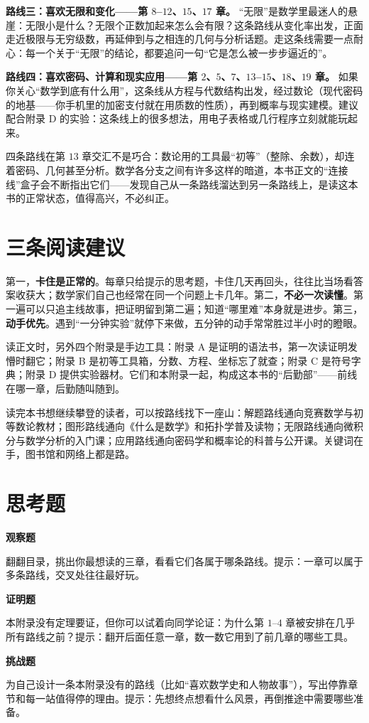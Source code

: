 \textbf{路线三：喜欢无限和变化——第 $8$–$12$、$15$、$17$ 章。} “无限”是数学里最迷人的悬崖：无限小是什么？无限个正数加起来怎么会有限？这条路线从变化率出发，正面走近极限与无穷级数，再延伸到与之相连的几何与分析话题。走这条线需要一点耐心：每一个关于“无限”的结论，都要追问一句“它是怎么被一步步逼近的”。

\textbf{路线四：喜欢密码、计算和现实应用——第 $2$、$5$、$7$、$13$–$15$、$18$、$19$ 章。} 如果你关心“数学到底有什么用”，这条线从方程与代数结构出发，经过数论（现代密码的地基——你手机里的加密支付就在用质数的性质），再到概率与现实建模。建议配合附录 D 的实验：这条线上的很多想法，用电子表格或几行程序立刻就能玩起来。

\begin{lianjie}
四条路线在第 $13$ 章交汇不是巧合：数论用的工具最“初等”（整除、余数），却连着密码、几何甚至分析。数学各分支之间有许多这样的暗道，本书正文的“连接线”盒子会不断指出它们——发现自己从一条路线溜达到另一条路线上，是读这本书的正常状态，值得高兴，不必纠正。
\end{lianjie}

\section{三条阅读建议}

第一，\textbf{卡住是正常的}。每章只给提示的思考题，卡住几天再回头，往往比当场看答案收获大；数学家们自己也经常在同一个问题上卡几年。第二，\textbf{不必一次读懂}。第一遍可以只追主线故事，把证明留到第二遍；知道“哪里难”本身就是进步。第三，\textbf{动手优先}。遇到“一分钟实验”就停下来做，五分钟的动手常常胜过半小时的瞪眼。

读正文时，另外四个附录是手边工具：附录 A 是证明的语法书，第一次读证明发懵时翻它；附录 B 是初等工具箱，分数、方程、坐标忘了就查；附录 C 是符号字典；附录 D 提供实验器材。它们和本附录一起，构成这本书的“后勤部”——前线在哪一章，后勤随叫随到。

\begin{pandeng}
读完本书想继续攀登的读者，可以按路线找下一座山：解题路线通向竞赛数学与初等数论教材；图形路线通向《什么是数学》和拓扑学普及读物；无限路线通向微积分与数学分析的入门课；应用路线通向密码学和概率论的科普与公开课。关键词在手，图书馆和网络上都是路。
\end{pandeng}

\section*{思考题}

\textbf{观察题}
\begin{sikao}
\item 翻翻目录，挑出你最想读的三章，看看它们各属于哪条路线。提示：一章可以属于多条路线，交叉处往往最好玩。
\end{sikao}

\textbf{证明题}
\begin{sikao}
\item 本附录没有定理要证，但你可以试着向同学论证：为什么第 $1$–$4$ 章被安排在几乎所有路线之前？提示：翻开后面任意一章，数一数它用到了前几章的哪些工具。
\end{sikao}

\textbf{挑战题}
\begin{sikao}
\item 为自己设计一条本附录没有的路线（比如“喜欢数学史和人物故事”），写出停靠章节和每一站值得停的理由。提示：先想终点想看什么风景，再倒推途中需要哪些准备。
\end{sikao}

